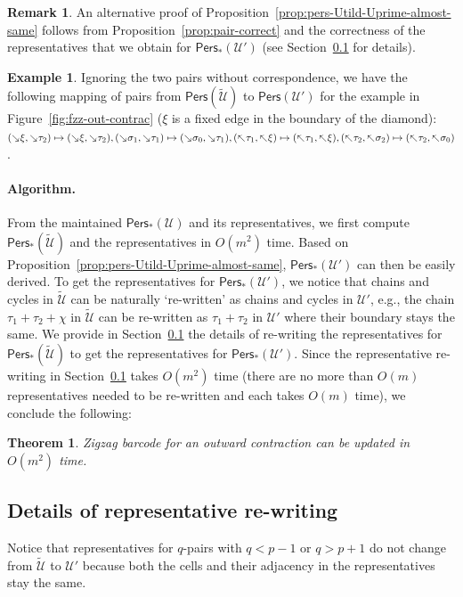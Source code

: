 \documentclass[letterpaper,11pt]{article}
\theoremstyle{mythmstyle}
\newtheorem{theorem}{Theorem}
\theoremstyle{mydefstyle}
\newtheorem*{remark*}{Remark}
\theoremstyle{plain}
\newtheorem{theorem}{Theorem}
\theoremstyle{definition}
\newtheorem*{remark*}{Remark}
\newtheorem*{example*}{Example}
\newcommand{\Pers}{\mathsf{Pers}}
\newcommand{\<}[1]{\langle #1\rangle}
\newcommand{\add}[1]{\mskip-2.5mu\rotatebox[origin=c]{-45}{${\rightarrow}$}{#1}}
\newcommand{\del}[1]{\mskip-2.5mu\rotatebox[origin=c]{-45}{${\leftarrow}$}{#1}}
\newcommand{\Ucal}{\mathcal{U}}
\newcommand{\sG}{\sigma}
\newcommand{\varsG}{{\xi}}
\newcommand{\Dim}{p}
\newcommand{\filtcnt}{m}
\newcommand{\extsimp}{\chi}
\begin{document}
\begin{remark*} 
An alternative proof of Proposition~\ref{prop:pers-Utild-Uprime-almost-same}
follows from Proposition~\ref{prop:pair-correct} and the correctness of the representatives
that we obtain for $\Pers_*({\Ucal}')$ (see Section~\ref{sec:out-contrac-rewrite-rep}
for details).
\end{remark*}
\begin{example*}
Ignoring the two pairs without correspondence,
we have the following mapping of pairs from $\Pers(\tilde{\Ucal})$
to $\Pers({\Ucal}')$ for the example in Figure~\ref{fig:fzz-out-contrac} ($\varsG$ 
is a fixed edge in the boundary of the diamond):
$(\add{\varsG},\add{\tau_2})\mapsto(\add{\varsG},\add{\tau_2}),
(\add{\sG_1},\add{\tau_1})\mapsto(\add{\sG_0},\add{\tau_1}),
(\del{\tau_1},\del{\varsG})\mapsto(\del{\tau_1},\del{\varsG}),
(\del{\tau_2},\del{\sG_2})\mapsto(\del{\tau_2},\del{\sG_0})$.
\end{example*}


\paragraph{Algorithm.}
From  the maintained $\Pers_*(\Ucal)$
and its  representatives,
we first compute $\Pers_*(\tilde{\Ucal})$ and the representatives
in $O(\filtcnt^2)$ time.
Based on Proposition~\ref{prop:pers-Utild-Uprime-almost-same}, 
$\Pers_*(\Ucal')$ can then be easily derived.
To get the representatives for $\Pers_*(\Ucal')$, 
we notice that chains and cycles in $\tilde{\Ucal}$
can be naturally `re-written' as chains and cycles in $\Ucal'$,
e.g.,
the chain $\tau_1+\tau_2+\extsimp$ in $\tilde{\Ucal}$
can be re-written as $\tau_1+\tau_2$ in $\Ucal'$
where their boundary stays the same.
We  provide in Section~\ref{sec:out-contrac-rewrite-rep} the details of re-writing
the representatives for $\Pers_*(\tilde{\Ucal})$
to get the representatives for $\Pers_*(\Ucal')$.
Since the representative re-writing in Section~\ref{sec:out-contrac-rewrite-rep}
takes $O(\filtcnt^2)$ time
(there are no more than $O(\filtcnt)$
representatives needed to be re-written
and each  takes $O(\filtcnt)$ time), 
we conclude the following:
\begin{theorem}
Zigzag barcode for an outward contraction can
be updated in $O(\filtcnt^2)$ time.
\end{theorem}


\subsection{Details of representative re-writing}
\label{sec:out-contrac-rewrite-rep}
Notice that representatives for $q$-pairs with $q<\Dim-1$ or $q>\Dim+1$ do not change
from $\tilde{\Ucal}$ to $\Ucal'$
because both the cells  and their adjacency in the representatives stay 
the same.
\end{document}
